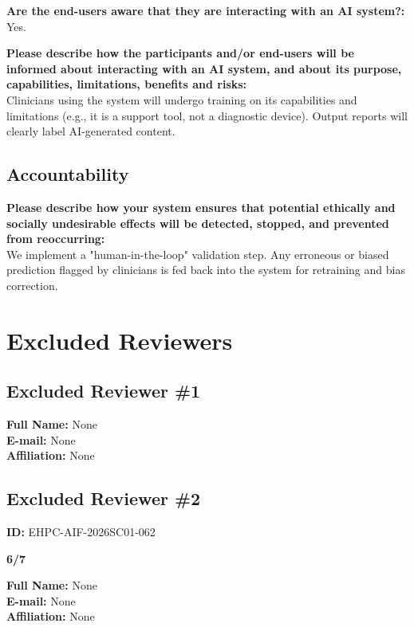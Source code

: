 \documentclass[11pt, a4paper]{article}
\begin{document}
\noindent\textbf{Are the end-users aware that they are interacting with an AI system?:} Yes.

\vspace{0.5em}
\noindent\textbf{Please describe how the participants and/or end-users will be informed about interacting with an AI system, and about its purpose, capabilities, limitations, benefits and risks:} \\
Clinicians using the system will undergo training on its capabilities and limitations (e.g., it is a support tool, not a diagnostic device). Output reports will clearly label AI-generated content.

\subsection*{Accountability}

\noindent\textbf{Please describe how your system ensures that potential ethically and socially undesirable effects will be detected, stopped, and prevented from reoccurring:} \\
We implement a "human-in-the-loop" validation step. Any erroneous or biased prediction flagged by clinicians is fed back into the system for retraining and bias correction.

\section*{Excluded Reviewers}

\subsection*{Excluded Reviewer \#1}

\noindent\textbf{Full Name:} None \\
\textbf{E-mail:} None \\
\textbf{Affiliation:} None

\subsection*{Excluded Reviewer \#2}

\noindent\textbf{ID:} EHPC-AIF-2026SC01-062

\vspace{0.5em}
\noindent\textbf{6/7}

\noindent\textbf{Full Name:} None \\
\textbf{E-mail:} None \\
\textbf{Affiliation:} None
\end{document}
